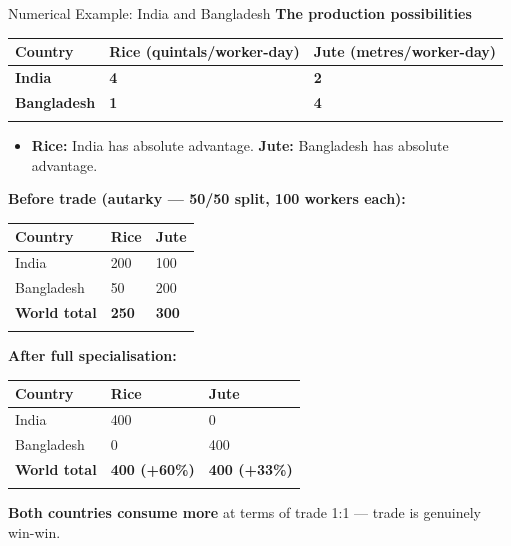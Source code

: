 \documentclass[
  ignorenonframetext,
  aspectratio=169,
]{beamer}
\makeatletter
\providecommand{\tightlist}{%
  \setlength{\itemsep}{0pt}\setlength{\parskip}{0pt}}
\let\quarto@originallabel\label
\DeclareRobustCommand*{\label}[1]{\quarto@originallabel{#1}}
\makeatother
\begin{document}
\begin{frame}{Numerical Example: India and Bangladesh}
\label{numerical-example-india-and-bangladesh}
\textbf{The production possibilities}

\begin{longtable}[]{@{}lll@{}}
\toprule\noalign{}
Country & Rice (quintals/worker-day) & Jute (metres/worker-day) \\
\midrule\noalign{}
\endhead
\textbf{India} & \textbf{4} & \textbf{2} \\
\textbf{Bangladesh} & \textbf{1} & \textbf{4} \\
\bottomrule\noalign{}
\end{longtable}

\begin{itemize}
\tightlist
\item
  \textbf{Rice:} India has absolute advantage. \textbf{Jute:} Bangladesh
  has absolute advantage.
\end{itemize}

\textbf{Before trade (autarky --- 50/50 split, 100 workers each):}

\begin{longtable}[]{@{}lll@{}}
\toprule\noalign{}
Country & Rice & Jute \\
\midrule\noalign{}
\endhead
India & 200 & 100 \\
Bangladesh & 50 & 200 \\
\textbf{World total} & \textbf{250} & \textbf{300} \\
\bottomrule\noalign{}
\end{longtable}

\textbf{After full specialisation:}

\begin{longtable}[]{@{}lll@{}}
\toprule\noalign{}
Country & Rice & Jute \\
\midrule\noalign{}
\endhead
India & 400 & 0 \\
Bangladesh & 0 & 400 \\
\textbf{World total} & \textbf{400 (+60\%)} & \textbf{400 (+33\%)} \\
\bottomrule\noalign{}
\end{longtable}

\textbf{Both countries consume more} at terms of trade 1:1 --- trade is
genuinely win-win.
\end{frame}
\end{document}
